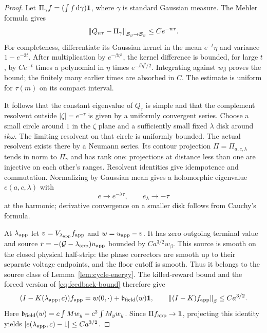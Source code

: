\begin{proof}
Let $\Pi_\gamma f=(\int f\,\mathrm d\gamma)\mathbf 1$, where $\gamma$ is standard
Gaussian measure. The Mehler formula gives
\begin{equation}\label{eq:Mehler-gap}
 \left\|Q_{n\tau}-\Pi_\gamma\right\|_{\mathcal B_\beta\to\mathcal B_\beta}\le Ce^{-n\tau}.
\end{equation}
For completeness, differentiate its Gaussian kernel in the mean
$e^{-t}\eta$ and variance $1-e^{-2t}$. After multiplication by
$e^{-\beta\eta^2}$, the kernel difference is bounded, for large $t$,
by $Ce^{-t}$ times a polynomial in $\eta$ times
$e^{-\beta\eta^2/2}$. Integrating against $w_\beta$ proves the
bound; the finitely many earlier times are absorbed in $C$.
The estimate is uniform for $\tau(m)$ on its compact interval.

It follows that the constant eigenvalue of $Q_\tau$ is simple and that
the complement resolvent outside $|\zeta|=e^{-\tau}$ is given by a
uniformly convergent series. Choose a small circle around $1$ in the
$\zeta$ plane and a sufficiently small fixed $\lambda$ disk around
$ik\omega$. The limiting resolvent on that circle is uniformly
bounded. The actual resolvent exists there by a Neumann series.
Its contour projection $\Pi=\Pi_{a,c,\lambda}$ tends in norm to
$\Pi_\gamma$ and has rank one: projections at distance less than one
are injective on each other's ranges. Resolvent identities give
idempotence and commutation. Normalizing by Gaussian mean gives a
holomorphic eigenvalue $e(a,c,\lambda)$ with
\[
 e\longrightarrow e^{-\lambda\tau},\qquad
 e_\lambda\longrightarrow-\tau
\]
at the harmonic; derivative convergence on a smaller disk follows
from Cauchy's formula.

At $\lambda_{\rm app}$ let
$v=V_{\lambda_{\rm app}}f_{\rm app}$ and $w=u_{\rm app}-v$.
It has zero outgoing terminal value and source
$r=-(\mathcal G-\lambda_{\rm app})u_{\rm app}$ bounded by
$Ca^{3/2}w_\beta$. This source is smooth on the closed physical
half-strip: the phase correctors are smooth up to their separate
voltage endpoints, and the floor cutoff is smooth.
Thus it belongs to the source class of Lemma~\ref{lem:cycle-energy}.
The killed-reward bound and the forced version of
\eqref{eq:feedback-bound} therefore give
\[
 (I-K(\lambda_{\rm app},c))f_{\rm app}
       =w(0,\cdot)+\mathfrak b_{\rm field}(w)\mathbf 1,\qquad
 \left\|(I-K)f_{\rm app}\right\|_\beta\le Ca^{3/2}.
\]
Here $\mathfrak b_{\rm field}(w)=c\int Mw_y-c^2\int M_yw_y$.
Since $\Pi f_{\rm app}\to\mathbf 1$, projecting this identity yields
$|e(\lambda_{\rm app},c)-1|\le Ca^{3/2}$.


\end{proof}
